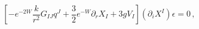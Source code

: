 \begin{equation}
\left[- e^{-2W} \frac{k}{r^2} G_{IJ} q^J + \frac 32 e^{-W} \partial_r X_I +
3gV_I\right](\partial_i X^I)\epsilon = 0\,,
\end{equation}

